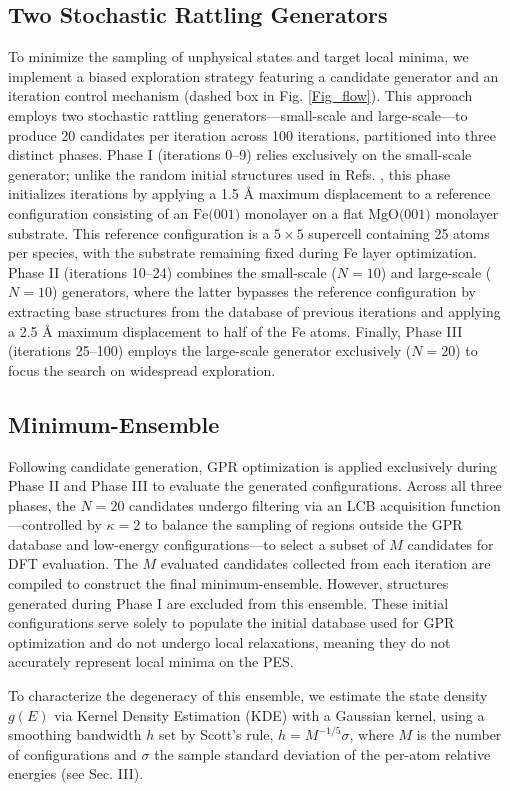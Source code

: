 \subsection{Two Stochastic Rattling Generators}

To minimize the sampling of unphysical states and target local minima, we implement a biased exploration strategy featuring a candidate generator and an iteration control mechanism (dashed box in Fig. \ref{Fig_flow}). This approach employs two stochastic rattling generators—small-scale and large-scale—to produce 20 candidates per iteration across 100 iterations, partitioned into three distinct phases. Phase I (iterations 0–9) relies exclusively on the small-scale generator; unlike the random initial structures used in Refs. \cite{Paleico2020, bisbo2022}, this phase initializes iterations by applying a 1.5 Å maximum displacement to a reference configuration consisting of an $\text{Fe(001)}$ monolayer on a flat $\text{MgO(001)}$ monolayer substrate. This reference configuration is a $5\times5$ supercell containing 25 atoms per species, with the substrate remaining fixed during Fe layer optimization. Phase II (iterations 10–24) combines the small-scale ($N = 10$) and large-scale ($N = 10$) generators, where the latter bypasses the reference configuration by extracting base structures from the database of previous iterations and applying a 2.5 Å maximum displacement to half of the Fe atoms. Finally, Phase III (iterations 25–100) employs the large-scale generator exclusively ($N = 20$) to focus the search on widespread exploration.

\subsection{Minimum-Ensemble}

Following candidate generation, GPR optimization is applied exclusively during Phase II and Phase III to evaluate the generated configurations. Across all three phases, the $N = 20$ candidates undergo filtering via an LCB acquisition function—controlled by $\kappa = 2$ to balance the sampling of regions outside the GPR database and low-energy configurations—to select a subset of $M$ candidates for DFT evaluation. The $M$ evaluated candidates collected from each iteration are compiled to construct the final minimum-ensemble. However, structures generated during Phase I are excluded from this ensemble. These initial configurations serve solely to populate the initial database used for GPR optimization and do not undergo local relaxations, meaning they do not accurately represent local minima on the PES.

To characterize the degeneracy of this ensemble, we estimate the state density $g(E)$ via Kernel Density Estimation (KDE) with a Gaussian kernel, using a smoothing bandwidth $h$ set by Scott's rule, $h = M^{-1/5} \sigma$, where $M$ is the number of configurations and $\sigma$ the sample standard deviation of the per-atom relative energies (see Sec. III).